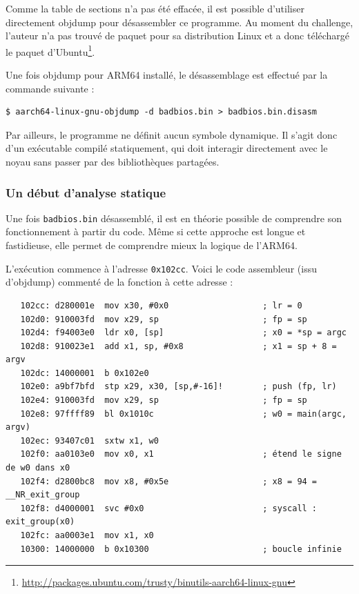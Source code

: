 \documentclass[a4paper,10pt]{article}
\begin{document}
Comme la table de sections n'a pas été effacée, il est possible d'utiliser directement objdump pour désassembler ce programme. Au moment du challenge, l'auteur n'a pas trouvé de paquet pour sa distribution Linux et a donc téléchargé le paquet d'Ubuntu\footnote{\url{http://packages.ubuntu.com/trusty/binutils-aarch64-linux-gnu}}.

Une fois objdump pour ARM64 installé, le désassemblage est effectué par la commande suivante :
\begin{verbatim}
$ aarch64-linux-gnu-objdump -d badbios.bin > badbios.bin.disasm
\end{verbatim}

Par ailleurs, le programme ne définit aucun symbole dynamique. Il s'agit donc d'un exécutable compilé statiquement, qui doit interagir directement avec le noyau sans passer par des bibliothèques partagées.

\subsubsection{Un début d'analyse statique}

Une fois \texttt{badbios.bin} désassemblé, il est en théorie possible de comprendre son fonctionnement à partir du code. Même si cette approche est longue et fastidieuse, elle permet de comprendre mieux la logique de l'ARM64.

L'exécution commence à l'adresse \texttt{0x102cc}. Voici le code assembleur (issu d'objdump) commenté de la fonction à cette adresse :

\begin{verbatim}
   102cc: d280001e  mov x30, #0x0                   ; lr = 0
   102d0: 910003fd  mov x29, sp                     ; fp = sp
   102d4: f94003e0  ldr x0, [sp]                    ; x0 = *sp = argc
   102d8: 910023e1  add x1, sp, #0x8                ; x1 = sp + 8 = argv
   102dc: 14000001  b 0x102e0
   102e0: a9bf7bfd  stp x29, x30, [sp,#-16]!        ; push (fp, lr)
   102e4: 910003fd  mov x29, sp                     ; fp = sp
   102e8: 97ffff89  bl 0x1010c                      ; w0 = main(argc, argv)
   102ec: 93407c01  sxtw x1, w0
   102f0: aa0103e0  mov x0, x1                      ; étend le signe de w0 dans x0
   102f4: d2800bc8  mov x8, #0x5e                   ; x8 = 94 = __NR_exit_group
   102f8: d4000001  svc #0x0                        ; syscall : exit_group(x0)
   102fc: aa0003e1  mov x1, x0
   10300: 14000000  b 0x10300                       ; boucle infinie
\end{verbatim}
\end{document}
